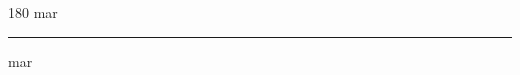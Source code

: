 
\begin{frame}
\begin{center}
\begin{turn}{180}
{\fontsize{2.5cm}{1em}\selectfont mar}
\end{turn}
\vspace{1em}\par  
\hrule
\vspace{1em}\par  
{\fontsize{2.5cm}{1em}\selectfont mar}
\end{center}
\end{frame}

